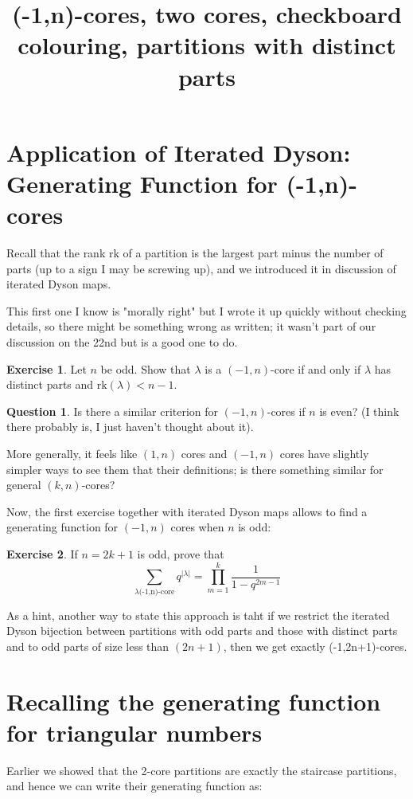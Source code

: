 \documentclass{article}
\title{(-1,n)-cores, two cores, checkboard colouring, partitions with distinct parts}
\theoremstyle{definition}
\newtheorem{question}{Question}
\newtheorem{exercise}{Exercise}
\begin{document}
\maketitle


\section{Application of Iterated Dyson: Generating Function for (-1,n)-cores}

Recall that the rank rk of a partition is the largest part minus the number of parts (up to a sign I may be screwing up), and we introduced it in discussion of iterated Dyson maps.

This first one I know is "morally right" but I wrote it up quickly without checking details, so there might be something wrong as written; it wasn't part of our discussion on the 22nd but is a good one to do.

\begin{exercise}
Let $n$ be odd.  Show that $\lambda$ is a $(-1,n)$-core if and only if $\lambda$ has distinct parts and $\textrm{rk}(\lambda)<n-1$.  
\end{exercise}

\begin{question}
Is there a similar criterion for $(-1,n)$-cores if $n$ is even?  (I think there probably is, I just haven't thought about it).  
\end{question}

More generally, it feels like $(1,n)$ cores and $(-1,n)$ cores have slightly simpler ways to see them that their definitions; is there something similar for general $(k,n)$-cores?


Now, the first exercise together with iterated Dyson maps allows to find a generating function for $(-1,n)$ cores when $n$ is odd:

\begin{exercise}
If $n=2k+1$ is odd, prove that
$$\sum_{\lambda \textrm{(-1,n)-core}} q^{|\lambda|}=\prod_{m=1}^k \frac{1}{1-q^{2m-1}}$$
\end{exercise}

As a hint, another way to state this approach is taht if we restrict the iterated Dyson bijection between partitions with odd parts and those with distinct parts and to odd parts of size less than $(2n+1)$, then we get exactly (-1,2n+1)-cores.

\section{Recalling the generating function for triangular numbers}
Earlier we showed that the 2-core partitions are exactly the staircase partitions, and hence we can write their generating function as:
\end{document}
